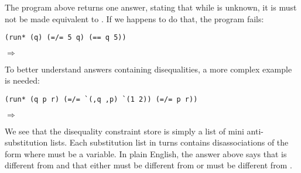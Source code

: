 The program above returns one answer, stating that while  is unknown, it is must not be made equivalent to . If we happens to do that, the program fails:
\begin{lstlisting}
(run* (q) (=/= 5 q) (== q 5))
\end{lstlisting}
$\Rightarrow$ \code{()}

To better understand answers containing disequalities, a more complex example is needed:
\begin{lstlisting}
(run* (q p r) (=/= `(,q ,p) `(1 2)) (=/= p r))
\end{lstlisting}
$\Rightarrow$

We see that the disequality constraint store is simply a list of mini anti-substitution lists. Each substitution list in turns contains disassociations of the form  where  must be a variable. In plain English, the answer above says that  is different from  and that either  must be different from  or  must be different from .